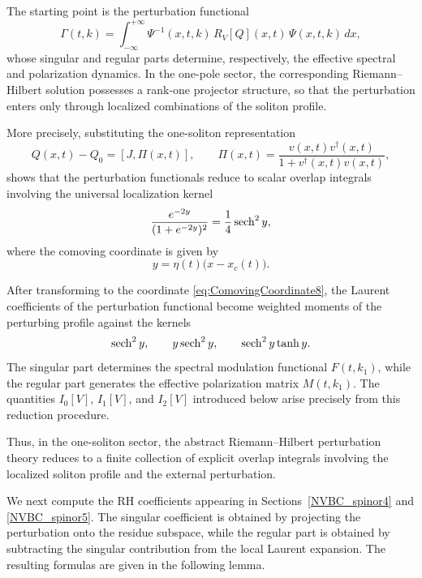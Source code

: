\documentclass[11pt]{amsart}
\newcommand{\sech}{\mathop{\rm sech}\nolimits}
\theoremstyle{definition}
\numberwithin{equation}{section}
\begin{document}
The starting point is the perturbation functional
\begin{equation}
\Gamma(t,k)
=
\int_{-\infty}^{+\infty}
\Psi^{-1}(x,t,k)\,
R_V[Q](x,t)\,
\Psi(x,t,k)\,dx,
\label{eq:GammaReduction8}
\end{equation}
whose singular and regular parts determine, respectively, the effective spectral and polarization dynamics. In the one-pole sector, the corresponding Riemann--Hilbert solution possesses a rank-one projector structure, so that the perturbation enters only through localized combinations of the soliton profile.

More precisely, substituting the one-soliton representation
\begin{equation}
Q(x,t)-Q_0=[J,\Pi(x,t)],
\qquad
\Pi(x,t)
=
\frac{v(x,t)v^\dagger(x,t)}
{1+v^\dagger(x,t)v(x,t)},
\label{eq:ProjectorReduction8}
\end{equation}
shows that the perturbation functionals reduce to scalar overlap integrals involving the universal localization kernel
\[
\frac{e^{-2y}}{(1+e^{-2y})^2}
=
\frac14\sech^2 y,
\]
where the comoving coordinate is given by
\begin{equation}
y=\eta(t)\bigl(x-x_c(t)\bigr).
\label{eq:ComovingCoordinate8}
\end{equation}

After transforming to the coordinate \eqref{eq:ComovingCoordinate8}, the Laurent coefficients of the perturbation functional become weighted moments of the perturbing profile against the kernels
\[
\sech^2 y,
\qquad
y\sech^2 y,
\qquad
\sech^2 y\tanh y.
\]
The singular part determines the spectral modulation functional $F(t,k_1)$, while the regular part generates the effective polarization matrix $M(t,k_1)$. The quantities $I_0[V]$, $I_1[V]$, and $I_2[V]$ introduced below arise precisely from this reduction procedure.

Thus, in the one-soliton sector, the abstract Riemann--Hilbert perturbation theory reduces to a finite collection of explicit overlap integrals involving the localized soliton profile and the external perturbation.

We next compute the RH coefficients appearing in Sections~\ref{NVBC_spinor4} and \ref{NVBC_spinor5}. The singular coefficient is obtained by projecting the perturbation onto the residue subspace, while the regular part is obtained by subtracting the singular contribution from the local Laurent expansion. The resulting formulas are given in the following lemma.
\end{document}
